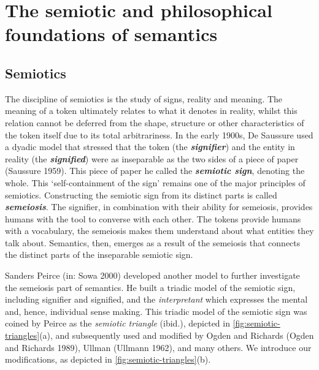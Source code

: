 \documentclass[a4paper,11pt,oneside,oldfontcommands]{memoir}
\newcounter{para}
\theoremstyle{definition}
\theoremstyle{break}		%
\numberwithin{equation}{chapter}
\numberwithin{figure}{chapter}
\begin{document}
\hypertarget{the-semiotic-and-philosophical-foundations-of-semantics}{%
\chapter{The semiotic and philosophical foundations of
semantics}\label{the-semiotic-and-philosophical-foundations-of-semantics}}

\hypertarget{semiotics}{%
\section{Semiotics}\label{semiotics}}

The discipline of semiotics is the study of signs, reality and meaning.
The meaning of a token ultimately relates to what it denotes in reality,
whilst this relation cannot be deferred from the shape, structure or
other characteristics of the token itself due to its total
arbitrariness. In the early 1900s, De Saussure used a dyadic model that
stressed that the token (the \textbf{\emph{signifier}}) and the entity
in reality (the \textbf{\emph{signified}}) were as inseparable as the
two sides of a piece of paper (Saussure 1959). This piece of paper he
called the \textbf{\emph{semiotic sign}}, denoting the whole. This
`self-containment of the sign' remains one of the major principles of
semiotics. Constructing the semiotic sign from its distinct parts is
called \textbf{\emph{semeiosis}}. The signifier, in combination with
their ability for semeiosis, provides humans with the tool to converse
with each other. The tokens provide humans with a vocabulary, the
semeiosis makes them understand about what entities they talk about.
Semantics, then, emerges as a result of the semeiosis that connects the
distinct parts of the inseparable semiotic sign.

Sanders Peirce (in: Sowa 2000) developed another model to further
investigate the semeiosis part of semantics. He built a triadic model of
the semiotic sign, including signifier and signified, and the
\emph{interpretant} which expresses the mental and, hence, individual
sense making. This triadic model of the semiotic sign was coined by
Peirce as the \emph{semiotic triangle} (ibid.), depicted in
\cref{fig:semiotic-triangles}(a), and subsequently used and modified by
Ogden and Richards (Ogden and Richards 1989), Ullman (Ullmann 1962), and
many others. We introduce our modifications, as depicted in
\cref{fig:semiotic-triangles}(b).
\end{document}
